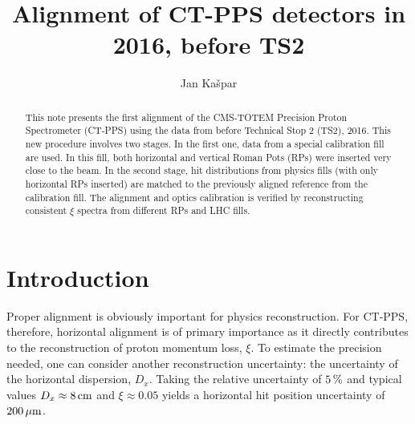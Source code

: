 \documentclass[TOTEM]{cern/cernphprep}
\def\un#1{\,{\rm #1}}
\begin{document}
\begin{titlepage}

\renewcommand{\EXPLOGO}{fig/logo_totem_black.pdf}

\PHnumber{}
\PHdate{}


\title{Alignment of CT-PPS detectors in 2016, before TS2}


\author{Jan Ka\v spar}


\begin{abstract}
This note presents the first alignment of the CMS-TOTEM Precision Proton Spectrometer (CT-PPS) using the data from before Technical Stop 2 (TS2), 2016. This new procedure involves two stages. In the first one, data from a special calibration fill are used. In this fill, both horizontal and vertical Roman Pots (RPs) were inserted very close to the beam. In the second stage, hit distributions from physics fills (with only horizontal RPs inserted) are matched to the previously aligned reference from the calibration fill. The alignment and optics calibration is verified by reconstructing consistent $\xi$ spectra from different RPs and LHC fills.
\end{abstract}


\end{titlepage}



\section{Introduction}
\label{s:intro}

Proper alignment is obviously important for physics reconstruction. For CT-PPS, therefore, horizontal alignment is of primary importance as it directly contributes to the reconstruction of proton momentum loss, $\xi$. To estimate the precision needed, one can consider another reconstruction uncertainty: the uncertainty of the horizontal dispersion, $D_x$. Taking the relative uncertainty of $5\un{\%}$ \cite{optics_calibration} and typical values $D_x \approx 8\un{cm}$ and $\xi \approx 0.05$ yields a horizontal hit position uncertainty of $200\un{\mu m}$.
\end{document}
